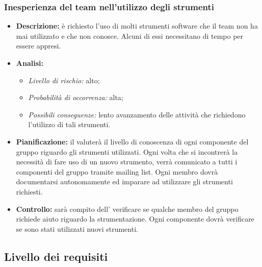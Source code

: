 		\subsubsection{Inesperienza del team nell'utilizzo degli strumenti}
			\begin{itemize}
				\item \textbf{Descrizione:} è richiesto l'uso di molti strumenti software che il team non ha mai utilizzato e che non conosce. Alcuni di essi necessitano di tempo per essere appresi.
				\item \textbf{Analisi:}
				\begin{itemize}
					\item \textit{Livello di rischio:} alto;
					\item \textit{Probabilità di occorrenza:} alta;
					\item \textit{Possibili conseguenze:} lento avanzamento delle attività che richiedono l'utilizzo di tali strumenti.
				\end{itemize}
				\item \textbf{Pianificazione:} il  valuterà il livello di conoscenza di ogni componente del gruppo riguardo gli strumenti utilizzati. Ogni volta che si incontrerà la necessità di fare uso di un nuovo strumento, verrà comunicato a tutti i componenti del gruppo tramite mailing list. Ogni membro dovrà documentarsi autonomamente ed imparare ad utilizzare gli strumenti richiesti.
				\item \textbf{Controllo:} sarà compito dell'  verificare se qualche membro del gruppo richiede aiuto riguardo la strumentazione. Ogni componente dovrà verificare se sono stati utilizzati nuovi strumenti.
			\end{itemize}
	\subsection{Livello dei requisiti}
